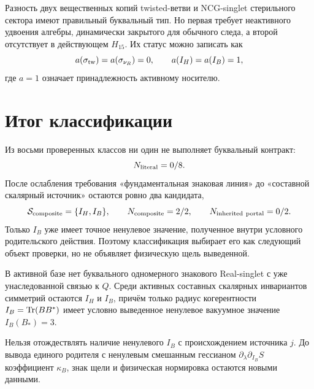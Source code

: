 Разность двух вещественных копий twisted-ветви и NCG-singlet стерильного
сектора имеют правильный буквальный тип. Но первая требует неактивного
удвоения алгебры, динамически закрытого для обычного следа, а второй
отсутствует в действующем $H_{15}$. Их статус можно записать как
\begin{equation}
 a(\sigma_{\rm tw})=a(\sigma_{\nu_R})=0,
 \qquad
 a(I_H)=a(I_B)=1,
 \label{eq:v8-existing-scalar-activity-indicators}
\end{equation}
где $a=1$ означает принадлежность активному носителю.

\section{Итог классификации}

Из восьми проверенных классов ни один не выполняет буквальный контракт:
\begin{equation}
 N_{\rm literal}=0/8.
 \label{eq:v8-existing-scalar-literal-ledger}
\end{equation}
После ослабления требования «фундаментальная знаковая линия» до
«составной скалярный источник» остаются ровно два кандидата,
\begin{equation}
 \mathcal S_{\rm composite}=\{I_H,I_B\},
 \qquad
 N_{\rm composite}=2/2,
 \qquad
 N_{\rm inherited\ portal}=0/2.
 \label{eq:v8-existing-scalar-composite-ledger}
\end{equation}
Только $I_B$ уже имеет точное ненулевое значение, полученное внутри
условного родительского действия. Поэтому классификация выбирает его как
следующий объект проверки, но не объявляет физическую щель выведенной.

\begin{theorem}
В активной базе нет буквального одномерного знакового Real-singlet с уже
унаследованной связью к $Q$. Среди активных составных скалярных инвариантов
симметрий остаются $I_H$ и $I_B$, причём только радиус когерентности
$I_B=\operatorname{Tr}(BB^*)$ имеет условно выведенное ненулевое вакуумное значение
$I_B(B_*)=3$.
\end{theorem}

\begin{nogocriterion}
Нельзя отождествлять наличие ненулевого $I_B$ с происхождением источника
$j$. До вывода единого родителя с ненулевым смешанным гессианом
$\partial_\lambda\partial_{I_B}S$ коэффициент $\kappa_B$, знак щели и
физическая нормировка остаются новыми данными.
\end{nogocriterion}

